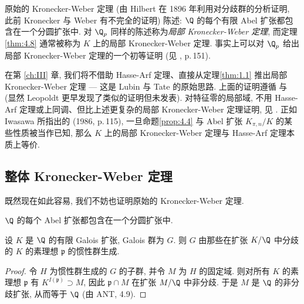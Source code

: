 \begin{remark}\label{rem:4.14}
原始的 Kronecker-Weber 定理 (由 Hilbert 在 1896 年利用对分歧群的分析证明, 此前 Kronecker 与 Weber 有不完全的证明) 陈述: $\Q$ 的每个有限 Abel 扩张都包含在一个分圆扩张中. 对 $\Q_p$ 同样的陈述称为\emph{局部 Kronecker-Weber 定理}, 而定理\ref{thm:4.8} 通常被称为 $K$ 上的局部 Kronecker-Weber 定理. 事实上可以对 $\Q_p$ 给出局部 Kronecker-Weber 定理的一个初等证明 (见 \cite{Cassels1986}, p.\,151).
\end{remark}

\begin{remark}\label{rem:4.15}
在第 \ref{ch:III} 章, 我们将不借助 Hasse-Arf 定理、直接从定理\ref{thm:1.1} 推出局部 Kronecker-Weber 定理 — 这是 Lubin 与 Tate 的原始思路. 上面的证明遵循 \cite{Gold1981} 与 \cite{Lubin1981} (显然 Leopoldt 更早发现了类似的证明但未发表). 对特征零的局部域, 不用 Hasse-Arf 定理或上同调、但比上述更复杂的局部 Kronecker-Weber 定理证明, 见 \cite{Rosen1981}. 正如 Iwasawa 所指出的 (1986, p.\,115), 一旦命题\ref{prop:4.4} 与 Abel 扩张 $K_{\pi,n}/K$ 的某些性质被当作已知, 那么 $K$ 上的局部 Kronecker-Weber 定理与 Hasse-Arf 定理本质上等价.
\end{remark}

\subsection*{整体 Kronecker-Weber 定理}

既然现在如此容易, 我们不妨也证明原始的 Kronecker-Weber 定理.

\begin{theorem}\label{thm:4.16}
$\Q$ 的每个 Abel 扩张都包含在一个分圆扩张中.
\end{theorem}

\begin{lemma}\label{lem:4.17}
设 $K$ 是 $\Q$ 的有限 Galois 扩张, Galois 群为 $G$. 则 $G$ 由那些在扩张 $K/\Q$ 中分歧的 $K$ 的素理想 $\mathfrak{p}$ 的惯性群生成.
\end{lemma}

\begin{proof}
令 $H$ 为惯性群生成的 $G$ 的子群, 并令 $M$ 为 $H$ 的固定域. 则对所有 $K$ 的素理想 $\mathfrak{p}$ 有 $K^{I(\mathfrak{p})}\supset M$, 因此 $\mathfrak{p}\cap M$ 在扩张 $M/\Q$ 中非分歧. 于是 $M$ 是 $\Q$ 的非分歧扩张, 从而等于 $\Q$ (由 ANT, 4.9).
\end{proof}

